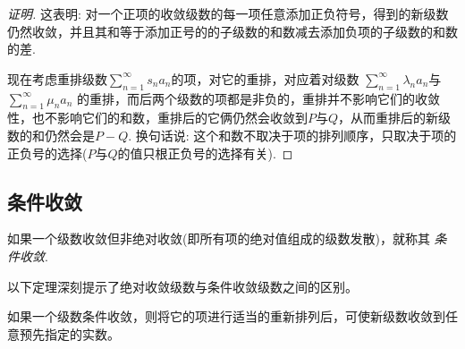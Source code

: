 \begin{proof}[证明]
  这表明: 对一个正项的收敛级数的每一项任意添加正负符号，得到的新级数仍然收敛，并且其和等于添加正号的的子级数的和数减去添加负项的子级数的和数的差.

  现在考虑重排级数$\sum_{n=1}^{\infty}s_na_n$的项，对它的重排，对应着对级数 $\sum_{n=1}^{\infty}\lambda_na_n$与$\sum_{n=1}^{\infty}\mu_na_n$ 的重排，而后两个级数的项都是非负的，重排并不影响它们的收敛性，也不影响它们的和数，重排后的它俩仍然会收敛到$P$与$Q$，从而重排后的新级数的和仍然会是$P-Q$. 换句话说: 这个和数不取决于项的排列顺序，只取决于项的正负号的选择($P$与$Q$的值只根正负号的选择有关).
\end{proof}


\subsection{条件收敛}
\label{sec:condition-coverage-of-series}

\begin{definition}
  如果一个级数收敛但非绝对收敛(即所有项的绝对值组成的级数发散)，就称其 \emph{条件收敛}.
\end{definition}


以下定理深刻提示了绝对收敛级数与条件收敛级数之间的区别。
\begin{theorem}[黎曼定理]
  如果一个级数条件收敛，则将它的项进行适当的重新排列后，可使新级数收敛到任意预先指定的实数。
\end{theorem}

